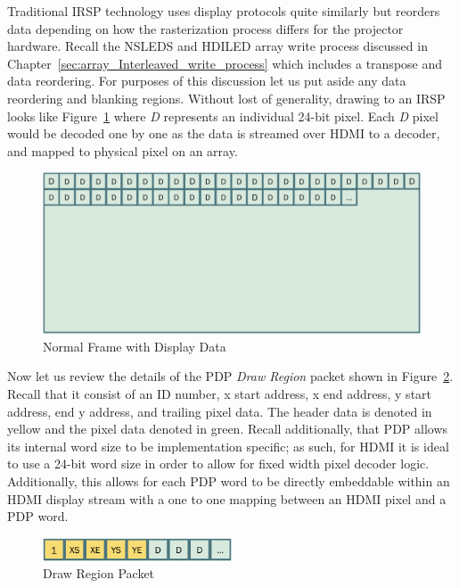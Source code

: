     Traditional IRSP technology uses display protocols quite similarly but reorders data depending on how the rasterization process differs for the projector hardware. Recall the NSLEDS and HDILED array write process discussed in Chapter~\ref{sec:array_Interleaved_write_process} which includes a transpose and data reordering. For purposes of this discussion let us put aside any data reordering and blanking regions. Without lost of generality, drawing to an IRSP looks like Figure~\ref{fig:classic_video} where {\it D} represents an individual 24-bit pixel. Each {\it D} pixel would be decoded one by one as the data is streamed over HDMI to a decoder, and mapped to physical pixel on an array.

    \begin{figure}
        \centering
        \includegraphics[width=1.0\textwidth]{fig/classic_video.pdf}
        \caption{Normal Frame with Display Data}
        \label{fig:classic_video}
    \end{figure}

    Now let us review the details of the PDP {\it Draw Region} packet shown in Figure~\ref{fig:packet_refresher}. Recall that it consist of an ID number, x start address, x end address, y start address, end y address, and trailing pixel data. The header data is denoted in yellow and the pixel data denoted in green. Recall additionally, that PDP allows its internal word size to be implementation specific; as such, for HDMI it is ideal to use a 24-bit word size in order to allow for fixed width pixel decoder logic. Additionally, this allows for each PDP word to be directly embeddable within an HDMI display stream with a one to one mapping between an HDMI pixel and a PDP word.

    \begin{figure}
        \centering
        \includegraphics[width=0.5\textwidth]{fig/packet_refresher.pdf}
        \caption{Draw Region Packet}
        \label{fig:packet_refresher}
    \end{figure}

